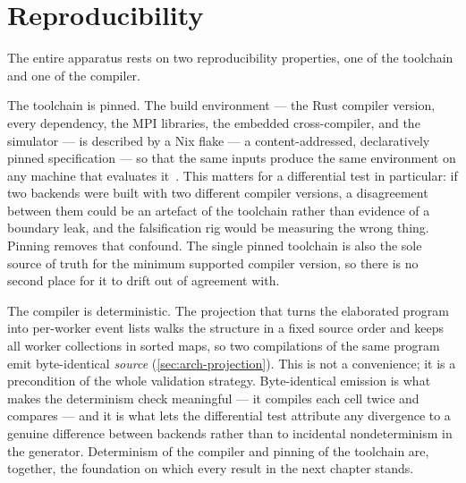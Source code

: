 \section{Reproducibility}\label{sec:val-repro}

The entire apparatus rests on two reproducibility properties, one of the toolchain
and one of the compiler.

The toolchain is pinned. The build environment --- the Rust compiler version, every
dependency, the MPI libraries, the embedded cross-compiler, and the simulator --- is
described by a Nix flake --- a content-addressed, declaratively pinned
specification --- so that the same inputs produce the same environment on any
machine that evaluates it~\cite{dolstra2004nix}. This matters for a differential test in particular: if
two backends were built with two different compiler versions, a disagreement
between them could be an artefact of the toolchain rather than evidence of a
boundary leak, and the falsification rig would be measuring the wrong thing.
Pinning removes that confound. The single pinned toolchain is also the sole source
of truth for the minimum supported compiler version, so there is no second place
for it to drift out of agreement with.

The compiler is deterministic. The projection that turns the elaborated program
into per-worker event lists walks the structure in a fixed source order and keeps
all worker collections in sorted maps, so two compilations of the same program emit
byte-identical \emph{source} (\cref{sec:arch-projection}). This is not a convenience; it is a
precondition of the whole validation strategy. Byte-identical emission is what
makes the determinism check meaningful --- it compiles each cell twice and compares
--- and it is what lets the differential test attribute any divergence to a
genuine difference between backends rather than to incidental nondeterminism in the
generator. Determinism of the compiler and pinning of the toolchain are, together,
the foundation on which every result in the next chapter stands.

